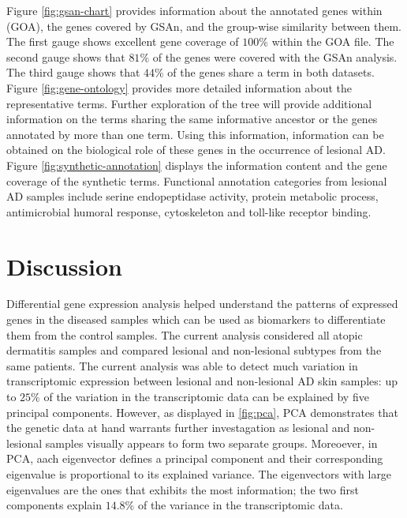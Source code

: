 \documentclass[journal, a4paper]{IEEEtran}
\begin{document}
Figure \ref{fig:gsan-chart} provides information about the annotated genes within (GOA), the genes covered by GSAn, and the group-wise similarity between them. The first gauge shows excellent gene coverage of $100\%$ within the GOA file. The second gauge shows that $81\%$ of the genes were covered with the GSAn analysis. The third gauge shows that $44\%$ of the genes share a term in both datasets.\\


Figure \ref{fig:gene-ontology} provides more detailed information about the representative terms. Further exploration of the tree will provide additional information on the terms sharing the same informative ancestor or the genes annotated by more than one term. Using this information, information can be obtained on the biological role of these genes in the occurrence of lesional AD.\\

Figure \ref{fig:synthetic-annotation} displays the information content and the gene coverage of the synthetic terms. Functional annotation categories from lesional AD samples include serine endopeptidase activity, protein metabolic process, antimicrobial humoral response, cytoskeleton and toll-like receptor binding.\\



\section{Discussion}

Differential gene expression analysis helped understand the patterns of expressed genes in the diseased samples which can be used as biomarkers to differentiate them from the control samples. The current analysis considered all atopic dermatitis samples and compared lesional and non-lesional subtypes from the same patients. The current analysis was able to detect much variation in transcriptomic expression between lesional and non-lesional AD skin samples: up to $25\%$ of the variation in the transcriptomic data can be explained by five principal components. However, as displayed in \ref{fig:pca}, PCA demonstrates that the genetic data at hand warrants further investagation as lesional and non-lesional samples visually appears to form two separate groups. Moreoever, in PCA, aach eigenvector defines a principal component and their corresponding eigenvalue is proportional to its explained variance. The eigenvectors with large eigenvalues are the ones that exhibits the most information; the two first components explain $14.8\%$ of the variance in the transcriptomic data.\\%
\end{document}
